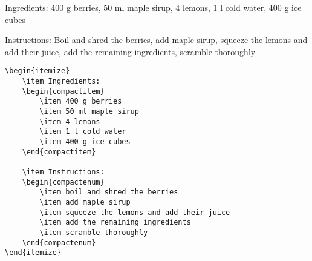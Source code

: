 Ingredients:
400 g berries, 50 ml maple sirup, 4 lemons, 1 l cold water, 400 g ice cubes

\noindent Instructions: Boil and shred the berries, add maple sirup, squeeze the lemons and add their juice, add the remaining ingredients, scramble thoroughly

\begin{verbatim}
\begin{itemize}
	\item Ingredients:
	\begin{compactitem}
		\item 400 g berries
		\item 50 ml maple sirup 
		\item 4 lemons
		\item 1 l cold water
		\item 400 g ice cubes
	\end{compactitem}

	\item Instructions:
	\begin{compactenum}
		\item boil and shred the berries
		\item add maple sirup
		\item squeeze the lemons and add their juice
		\item add the remaining ingredients
		\item scramble thoroughly
	\end{compactenum}
\end{itemize}
\end{verbatim}
